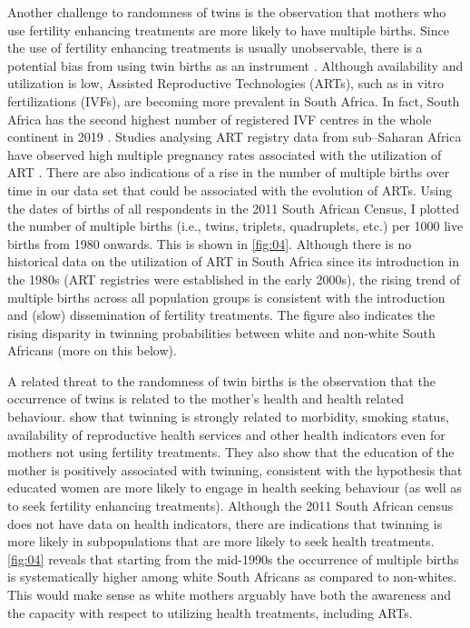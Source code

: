 Another challenge to randomness of twins is the observation that mothers who use fertility enhancing treatments are more likely to have multiple births. Since the use of fertility enhancing treatments is usually unobservable, there is a potential bias from using twin births as an instrument \parencite{braakmann_reconsidering_2016}. Although availability and utilization is low, Assisted Reproductive Technologies (ARTs), such as in vitro fertilizations (IVFs), are becoming more prevalent in South Africa. In fact, South Africa has the second highest number of registered IVF centres in the whole continent in 2019 \parencite{Ombelet2019}. Studies analysing ART registry data from sub–Saharan Africa have observed high multiple pregnancy rates associated with the utilization of ART \parencite{Botha2018,Dyer2019}. There are also indications of a rise in the number of multiple births over time in our data set that could be associated with the evolution of ARTs. Using the dates of births of all respondents in the 2011 South African Census, I plotted the number of multiple births (i.e., twins, triplets, quadruplets, etc.) per 1000 live births from 1980 onwards. This is shown in \autoref{fig:04}. Although there is no historical data on the utilization of ART in South Africa since its introduction in the 1980s (ART registries were established in the early 2000s), the rising trend of multiple births across all population groups is consistent with the introduction and (slow) dissemination of fertility treatments. The figure also indicates the rising disparity in twinning probabilities between white and non-white South Africans (more on this below).

A related threat to the randomness of twin births is the observation that the occurrence of twins is related to the mother's health and health related behaviour. \textcite{bhalotra_twin_2019} show that twinning is strongly related to morbidity, smoking status, availability of reproductive health services and other health indicators even for mothers not using fertility treatments. They also show that the education of the mother is positively associated with twinning, consistent with the hypothesis that educated women are more likely to engage in health seeking behaviour (as well as to seek fertility enhancing treatments). Although the 2011 South African census does not have data on health indicators, there are indications that twinning is more likely in subpopulations that are more likely to seek health treatments. \autoref{fig:04} reveals that starting from the mid-1990s the occurrence of multiple births is systematically higher among white South Africans as compared to non-whites. This would make sense as white mothers arguably have both the awareness and the capacity with respect to utilizing health treatments, including ARTs. 

